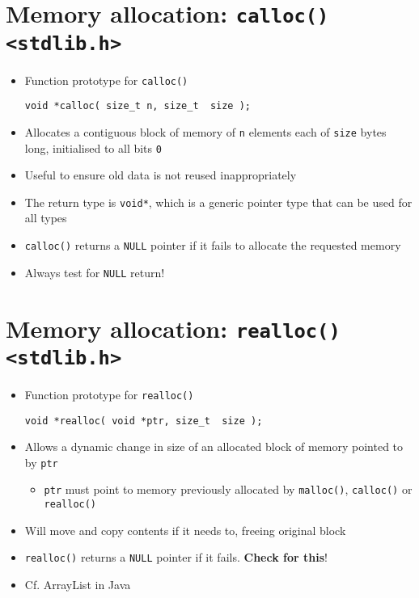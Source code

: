 \documentclass{article}
\begin{document}
\section{Memory allocation: \texttt{calloc() <stdlib.h>}}
\begin{itemize}
\item Function prototype for \verb!calloc()!
\begin{verbatim}
void *calloc( size_t n, size_t  size );
\end{verbatim}
\item Allocates a contiguous block of memory of \verb!n! elements each of \verb!size! bytes long, initialised to all bits \verb!0!

\item Useful to ensure old data is not reused inappropriately

\item The return type is \verb!void*!, which is a generic pointer type that can be used for all types

\item \verb!calloc()! returns a \verb!NULL! pointer if it fails to allocate the requested memory
\item Always test for \verb!NULL! return!
\end{itemize}



\section{Memory allocation: \texttt{realloc() <stdlib.h>}}
\begin{itemize}
\item Function prototype for \verb!realloc()!
\begin{verbatim}
void *realloc( void *ptr, size_t  size );
\end{verbatim}

\item Allows a dynamic change in size of an allocated block of memory pointed to by \verb!ptr!
\begin{itemize}
\item \verb!ptr! must point to memory previously allocated by \verb!malloc()!, \verb!calloc()! or \verb!realloc()!
\end{itemize}

\item Will move and copy contents if it needs to, freeing original block
\item \verb!realloc()! returns a \verb!NULL! pointer if it fails. \textbf{Check for this}!
\item Cf. ArrayList in Java
\end{itemize}
\end{document}

